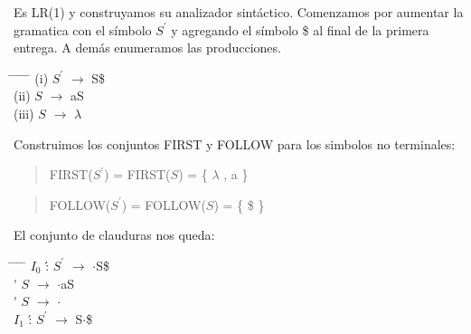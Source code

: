 \documentclass{article}
\begin{document}
\begin{enumerate}
\begin{enumerate}
\begin{enumerate}
\begin{tabbing}
								\end{tabbing}
								Es LR(1) y construyamos su analizador sint\'actico. 
								Comenzamos por aumentar la gramatica con el s\'imbolo $S^{\prime}$ y agregando el s\'imbolo \$ al final de la primera entrega. A dem\'as enumeramos las producciones.
								\begin{tabbing}
								\hspace*{1cm} \= \hspace*{1cm} \= \hspace*{1cm} \= \hspace*{0.6cm} \= \hspace*{0.6cm} \= \hspace*{3cm} \kill
									\> (i)\>  $S^{\prime}$	\> $\longrightarrow$\> 	S\$ 	\\
									\> (ii)\>  $S$	\> $\longrightarrow$\> 	aS 	\\
									\> (iii)\>  $S$	\> $\longrightarrow$\>  $\lambda$ 	\\
								\end{tabbing}
								Construimos los conjuntos FIRST y FOLLOW para los simbolos no terminales:
								\begin{quotation}
									FIRST($S^{\prime}$) =  FIRST($S$) = \{ $\lambda$ , a \}
								\end{quotation}

								\begin{quotation}
									FOLLOW($S^{\prime}$) =  FOLLOW($S$) = \{ \$ \}
								\end{quotation}

								El conjunto de clauduras nos queda:\\
								\begin{tabbing}
								 \hspace*{1cm} \= \hspace*{1cm} \= \hspace*{0.6cm} \= \hspace*{0.6cm} \= \hspace*{3cm} \kill
									\> $I_{0}$	\' : 	\> $S^{\prime}$	\> $\longrightarrow$\> 	$\cdot$S\$ 	\\
									\>		\'  	\> $S$ 			\> $\longrightarrow$\> 	$\cdot$aS 	\\
									\>		\'  	\> $S$ 			\> $\longrightarrow$\> 	$\cdot$ 	\\
								
									\>$I_{1}$	\' : 	\> $S^{\prime}$ \> $\longrightarrow$\> 	S$\cdot$\$	\\
									

\end{tabbing}
\end{enumerate}
\end{enumerate}
\end{enumerate}
\end{document}
